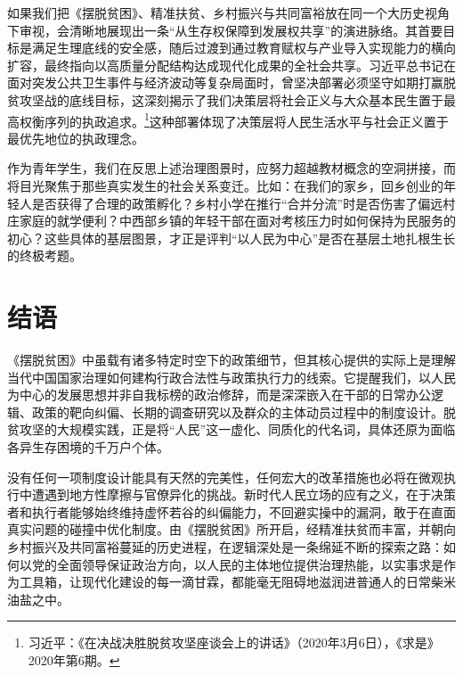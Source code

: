\documentclass[12pt,a4paper]{ctexart}
\begin{document}
如果我们把《摆脱贫困》、精准扶贫、乡村振兴与共同富裕放在同一个大历史视角下审视，会清晰地展现出一条“从生存权保障到发展权共享”的演进脉络。其首要目标是满足生理底线的安全感，随后过渡到通过教育赋权与产业导入实现能力的横向扩容，最终指向以高质量分配结构达成现代化成果的全社会共享。习近平总书记在面对突发公共卫生事件与经济波动等复杂局面时，曾坚决部署必须坚守如期打赢脱贫攻坚战的底线目标，这深刻揭示了我们决策层将社会正义与大众基本民生置于最高权衡序列的执政追求。\footnote{习近平：《在决战决胜脱贫攻坚座谈会上的讲话》（2020年3月6日），《求是》2020年第6期。}这种部署体现了决策层将人民生活水平与社会正义置于最优先地位的执政理念。

作为青年学生，我们在反思上述治理图景时，应努力超越教材概念的空洞拼接，而将目光聚焦于那些真实发生的社会关系变迁。比如：在我们的家乡，回乡创业的年轻人是否获得了合理的政策孵化？乡村小学在推行“合并分流”时是否伤害了偏远村庄家庭的就学便利？中西部乡镇的年轻干部在面对考核压力时如何保持为民服务的初心？这些具体的基层图景，才正是评判“以人民为中心”是否在基层土地扎根生长的终极考题。

\section*{结语}

《摆脱贫困》中虽载有诸多特定时空下的政策细节，但其核心提供的实际上是理解当代中国国家治理如何建构行政合法性与政策执行力的线索。它提醒我们，以人民为中心的发展思想并非自我标榜的政治修辞，而是深深嵌入在干部的日常办公逻辑、政策的靶向纠偏、长期的调查研究以及群众的主体动员过程中的制度设计。脱贫攻坚的大规模实践，正是将“人民”这一虚化、同质化的代名词，具体还原为面临各异生存困境的千万户个体。

没有任何一项制度设计能具有天然的完美性，任何宏大的改革措施也必将在微观执行中遭遇到地方性摩擦与官僚异化的挑战。新时代人民立场的应有之义，在于决策者和执行者能够始终维持虚怀若谷的纠偏能力，不回避实操中的漏洞，敢于在直面真实问题的碰撞中优化制度。由《摆脱贫困》所开启，经精准扶贫而丰富，并朝向乡村振兴及共同富裕蔓延的历史进程，在逻辑深处是一条绵延不断的探索之路：如何以党的全面领导保证政治方向，以人民的主体地位提供治理热能，以实事求是作为工具箱，让现代化建设的每一滴甘霖，都能毫无阻碍地滋润进普通人的日常柴米油盐之中。
\end{document}
